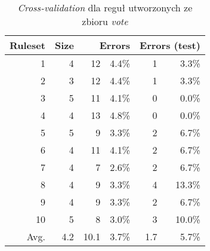 \begin{table}
\begin{tabular}{|r|r|rr|rr|}
\hline
 Ruleset & 
 Size & 
 \multicolumn{2}{1|}{Errors} & 
 \multicolumn{2}{1|}{Errors (test)} \\
\hline\hline
       1 &    4 &   12 & 4.4\% &    1 &  3.3\% \\
       2 &    3 &   12 & 4.4\% &    1 &  3.3\% \\
       3 &    5 &   11 & 4.1\% &    0 &  0.0\% \\
       4 &    4 &   13 & 4.8\% &    0 &  0.0\% \\
       5 &    5 &    9 & 3.3\% &    2 &  6.7\% \\
       6 &    4 &   11 & 4.1\% &    2 &  6.7\% \\
       7 &    4 &    7 & 2.6\% &    2 &  6.7\% \\
       8 &    4 &    9 & 3.3\% &    4 & 13.3\% \\
       9 &    4 &    9 & 3.3\% &    2 &  6.7\% \\
      10 &    5 &    8 & 3.0\% &    3 & 10.0\% \\
\hline\hline
    Avg. &  4.2 & 10.1 & 3.7\% &  1.7 &  5.7\% \\
\hline
\end{tabular}
\caption{\emph{Cross-validation} dla reguł utworzonych ze zbioru \emph{vote}}
\label{p2t2-vote-rules-cv}
\end{table}
